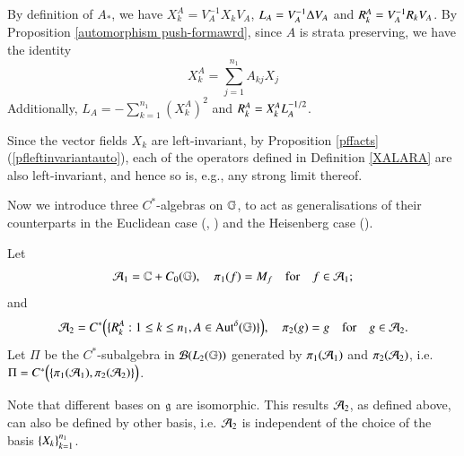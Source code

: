 \documentclass[leqno]{amsart}
\begin{document}
	 
%	 
	
	By definition of $A_*$, we have $X^A_k=V_A^{-1}X_k V_A$, $L_{A}=V_{A}^{-1} \Delta V_{A}$ and $R^{A}_{k}=V_{A}^{-1} R_{k}V_{A}$. By Proposition \ref{automorphism push-formawrd}, since $A$ is strata preserving, we have the identity
	$$X^A_k=\sum_{j=1}^{n_1} A_{kj} X_j$$
	Additionally, $\displaystyle L_A=-\sum_{k=1}^{n_{1}}(X^A_k)^{2}$ and ${ R}^{A}_{k}=X^A_k L_A^{-1/2}$.
	
	\begin{remark}\label{left invariance}
		Since the vector fields $X_k$ are left-invariant, by Proposition \ref{pffacts} (\ref{pfleftinvariantauto}), each of the operators defined in Definition \ref{XALARA} are also left-invariant, and hence so is, e.g., any strong limit thereof.
	\end{remark}
	
	
	
	Now we introduce three $C^{*}$-algebras on $\mathbb{G}$, to act as generalisations of their counterparts in the Euclidean case (\!\cite[Definition 1.1]{DAO1}, \cite[Definition 1.1]{DAO3}) and the Heisenberg case (\!\cite[Definition 1.3.1]{DAO4}).
	\begin{definition}
		Let 
		\begin{align*}
			\A_{1}=\CC+C_0(\GG),
			\quad%
			\po(f)=M_{f}\quad\mbox{for}\quad f\in\A_{1};
		\end{align*}
		and %
		\begin{align*}
			\A_{2}=C^{*}\Big(\{\quasiriesz A k:1\leq k\leq n_1, A\in \at\}\Big),
			\quad%
			\pt(g)=g\quad\mbox{for}\quad g\in\A_{2}.
		\end{align*}
		Let $\Pi$ be the $C^{*}$-subalgebra in ${\mathcal B}(L_{2}(\mathbb{G}))$ generated by $\pi_{1}({\mathcal A}_{1})$ and $\pi_{2}({\mathcal A}_{2})$, i.e.
		$\Pi=C^{*}\Big(\{\pi_{1}({\mathcal A}_{1}),\pi_{2}({\mathcal A}_{2})\}\Big)$.
		
	\end{definition}
 \begin{remark}
	Note that different bases  on $\mathfrak{g}$ are isomorphic. This results ${\mathcal A}_2$, as defined above, can also be defined by other basis, i.e. ${\mathcal A}_2$ is independent of the choice of the basis $\left\{ X_k \right\}_{k=1}^{n_{1}}$.
 \end{remark}
	
\end{document}
